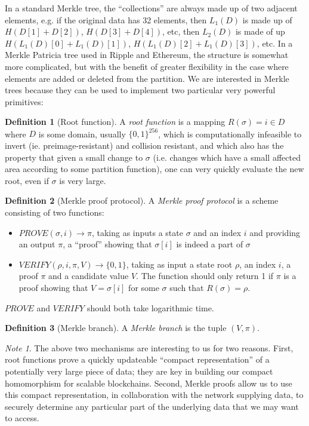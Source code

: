 \documentclass[11pt,a4paper]{article}
\makeatletter
\theoremstyle{plain}
\theoremstyle{definition}
\newtheorem{defn}{Definition}[section]
\theoremstyle{remark}
\newtheorem*{note}{Note}
\newcommand{\ie}{i.e.\@\xspace}
\newcommand{\eg}{e.g.\@\xspace}
\makeatother
\begin{document}
In a standard Merkle tree, the ``collections'' are always made up of two adjacent elements, \eg if the original data has 32 elements, then $L_1(D)$ is made up of $H(D[1] + D[2])$, $H(D[3] + D[4])$, etc, then $L_2(D)$ is made of up $H(L_1(D)[0] + L_1(D)[1])$, $H(L_1(D)[2] + L_1(D)[3])$, etc. In a Merkle Patricia tree\cite{mpt} used in Ripple and Ethereum, the structure is somewhat more complicated, but with the benefit of greater flexibility in the case where elements are added or deleted from the partition. We are interested in Merkle trees because they can be used to implement two particular very powerful primitives:

\begin{defn}[Root function]
A \emph{root function} is a mapping $R(\sigma) = i \in D$ where $D$ is some domain, usually $\{0,1\}^{256}$, which is computationally infeasible to invert (ie. preimage-resistant) and collision resistant, and which also has the property that given a small change to $\sigma$ (\ie changes which have a small affected area according to some partition function), one can very quickly evaluate the new root, even if $\sigma$ is very large.
\end{defn}

\begin{defn}[Merkle proof protocol]
A \emph{Merkle proof protocol} is a scheme consisting of two functions:
\begin{itemize}
\item
$PROVE(\sigma, i) \rightarrow \pi$, taking as inputs a state $\sigma$ and an index $i$ and providing an output $\pi$, a ``proof'' showing that $\sigma[i]$ is indeed a part of $\sigma$
\item
$VERIFY(\rho, i, \pi, V) \rightarrow \{0, 1\}$, taking as input a state root $\rho$, an index $i$, a proof $\pi$ and a candidate value $V$. The function should only return 1 if $\pi$ is a proof showing that $V = \sigma[i]$ for some $\sigma$ such that $R(\sigma) = \rho$.
\end{itemize}
$PROVE$ and $VERIFY$ should both take logarithmic time.
\end{defn}

\begin{defn}[Merkle branch]
A \emph{Merkle branch} is the tuple $(V, \pi)$.
\end{defn}

\begin{note}
The above two mechanisms are interesting to us for two reasons. First, root functions prove a quickly updateable ``compact representation'' of a potentially very large piece of data; they are key in building our compact homomorphism for scalable blockchains. Second, Merkle proofs allow us to use this compact representation, in collaboration with the network supplying data, to securely determine any particular part of the underlying data that we may want to access.
\end{note}
\end{document}
